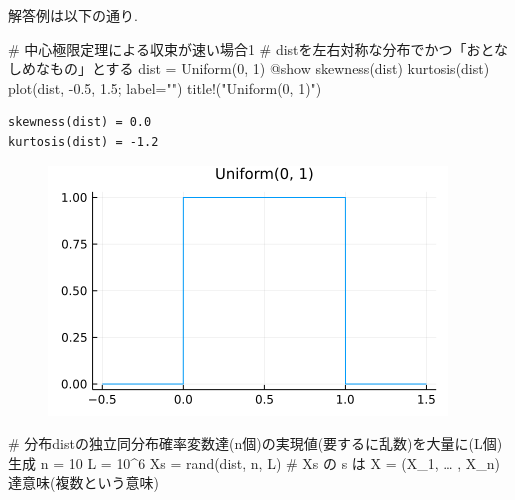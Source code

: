 \documentclass[
  letterpaper,
  DIV=11,
  numbers=noendperiod]{scrartcl}
\newenvironment{Shaded}{\begin{snugshade}}{\end{snugshade}}
\newcommand{\CommentTok}[1]{\textcolor[rgb]{0.37,0.37,0.37}{#1}}
\newcommand{\FloatTok}[1]{\textcolor[rgb]{0.68,0.00,0.00}{#1}}
\newcommand{\FunctionTok}[1]{\textcolor[rgb]{0.28,0.35,0.67}{#1}}
\newcommand{\NormalTok}[1]{\textcolor[rgb]{0.00,0.23,0.31}{#1}}
\newcommand{\OperatorTok}[1]{\textcolor[rgb]{0.37,0.37,0.37}{#1}}
\newcommand{\PreprocessorTok}[1]{\textcolor[rgb]{0.68,0.00,0.00}{#1}}
\newcommand{\StringTok}[1]{\textcolor[rgb]{0.13,0.47,0.30}{#1}}
\begin{document}
解答例は以下の通り.

\begin{Shaded}
\begin{Highlighting}[]
\CommentTok{\# 中心極限定理による収束が速い場合1}
\CommentTok{\# distを左右対称な分布でかつ「おとなしめなもの」とする}
\NormalTok{dist }\OperatorTok{=} \FunctionTok{Uniform}\NormalTok{(}\FloatTok{0}\NormalTok{, }\FloatTok{1}\NormalTok{)}
\PreprocessorTok{@show} \FunctionTok{skewness}\NormalTok{(dist) }\FunctionTok{kurtosis}\NormalTok{(dist)}
\FunctionTok{plot}\NormalTok{(dist, }\OperatorTok{{-}}\FloatTok{0.5}\NormalTok{, }\FloatTok{1.5}\NormalTok{; label}\OperatorTok{=}\StringTok{""}\NormalTok{)}
\FunctionTok{title!}\NormalTok{(}\StringTok{"Uniform(0, 1)"}\NormalTok{)}
\end{Highlighting}
\end{Shaded}

\begin{verbatim}
skewness(dist) = 0.0
kurtosis(dist) = -1.2
\end{verbatim}

\begin{figure}[H]

{\centering \includegraphics{05 Central limit theorem_files/figure-pdf/cell-69-output-2.png}

}

\end{figure}

\begin{Shaded}
\begin{Highlighting}[]
\CommentTok{\# 分布distの独立同分布確率変数達(n個)の実現値(要するに乱数)を大量に(L個)生成}
\NormalTok{n }\OperatorTok{=} \FloatTok{10}
\NormalTok{L }\OperatorTok{=} \FloatTok{10}\OperatorTok{\^{}}\FloatTok{6}
\NormalTok{Xs }\OperatorTok{=} \FunctionTok{rand}\NormalTok{(dist, n, L) }\CommentTok{\# Xs の s は X = (X\_1, … , X\_n) 達意味(複数という意味)}
\end{Highlighting}
\end{Shaded}
\end{document}
